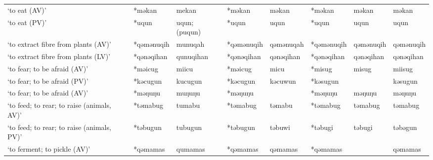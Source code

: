 \begin{landscape}
\begin{longtable}[c]{@{}p{3cm}<{\raggedright}p{2.75cm}<{\raggedright}p{2.75cm}<{\raggedright}p{2.75cm}<{\raggedright}p{2.75cm}<{\raggedright}p{2.75cm}<{\raggedright}p{2.75cm}<{\raggedright}p{2.75cm}<{\raggedright}@{}}
`to eat (AV)'                                        & *məkan             & mekan                          & *məkan             & məkan                      & *məkan           & məkan                    & məkan                             \\
`to eat (PV)'                                        & *uqun              & uqun; (puqun)                  & *uqun              & uqun                       & *uqun            & uqun                     & uqun                              \\
`to extract fibre from plants (AV)'                  & *qəmənuqih         & munuqah                        & *qəmənuqih         & qəmənuqah                  & *qəmənuqih       & qəmənuqih                & qəmənuqih                         \\
`to extract fibre from plants (LV)'                  & *qənəqihan         & qunuqihan                      & *qənəqihan         & qənəqihan                  & *qənəqihan       & qənəqihan                & qənəqihan                         \\
`to fear; to be afraid (AV)'                         & *məicug            & miicu                          & *məicug            & micu                       & *misug           & misug                    & miisug                            \\
`to fear; to be afraid (PV)'                         & *kəcugun           & kucugun                        & *kəcugun           & kəcuwun                    & *kəsugun         &                          & kəsugun                           \\
`to fear; to be afraid (AV)'                         & *məŋuŋu            & muŋuŋu                         & *məŋuŋu            &                            & *məŋuŋu          & məŋuŋu                   & məŋuŋu                            \\
`to feed; to rear; to raise (animals, AV)'           & *təmabug           & tumabu                         & *təmabug           & təmabu                     & *təmabug         & təmabug                  & təmabug                           \\
`to feed; to rear; to raise (animals, PV)'           & *təbugun           & tubugun                        & *təbugun           & təbuwi                     & *təbugi          & təbugi                   & təbəgun                           \\
`to ferment; to pickle (AV)'                         & *qəmamas           & qumamas                        & *qəmamas           & qəmamas                    & *qəmamas         &                          & qəmamas                           \\

\end{longtable}
\end{landscape}
